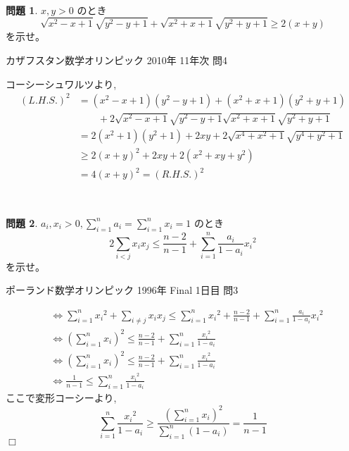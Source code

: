 \documentclass[uplatex, a5paper]{jsarticle}
\makeatletter
\theoremstyle{definition}
\newtheorem{prob}{問題}
\renewenvironment{proof}[1][\proofname]{
  \pushQED{\qed}%
  \normalfont \topsep6\p@\@plus6\p@\relax
  \trivlist
  \item[\hskip\labelsep
    #1\@addpunct{\textbf{.}}]\ignorespaces
}{%
  \popQED\endtrivlist\@endpefalse
}
\providecommand{\proofname}{証明}
\newcommand{\lhs }{ L.H.S. }
\newcommand{\rhs }{ R.H.S. }
\def\qed{\hfill $\Box$}
\makeatother
\begin{document}
\

\newpage


\begin{prob}
  \(x,y > 0\)
  のとき
  \[
  \sqrt{x^2-x+1}\sqrt{y^2-y+1} + \sqrt{x^2+x+1}\sqrt{y^2+y+1} \geq 2(x+y)
  \]
  を示せ。
  \begin{flushright}
    カザフスタン数学オリンピック 2010年 11年次 問4
  \end{flushright}
\end{prob}


\begin{proof}

コーシーシュワルツより,
\begin{align*}
( \lhs )^2 &= (x^2-x+1)(y^2-y+1) + (x^2+x+1)(y^2+y+1) \\
& \qquad + 2\sqrt{x^2-x+1}\sqrt{y^2-y+1}\sqrt{x^2+x+1}\sqrt{y^2+y+1} \\
&=     2(x^2+1)(y^2+1) + 2xy + 2\sqrt{ x^4+x^2+1 }\sqrt{ y^4+y^2+1 } \\
&\geq  2(x+y)^2 + 2xy + 2(x^2+xy+y^2) \\
&=     4(x+y)^2 = ( \rhs )^2
\end{align*}

\end{proof}



\








\newpage

\begin{prob}
  \(a_i , x_i > 0 , \displaystyle\sum_{i=1}^n a_i =\sum_{i=1}^n x_i = 1\)
  のとき
  \[
  2\sum_{i<j}x_ix_j \leq \frac{n-2}{n-1} + \sum_{i=1}^n \frac{a_i}{1-a_i}{x_i}^2
  \]
  を示せ。
  \begin{flushright}
    ポーランド数学オリンピック 1996年 Final 1日目 問3
  \end{flushright}
\end{prob}


\begin{proof}

\begin{align*}
& \Leftrightarrow \sum_{i=1}^n {x_i}^2 + \sum_{i\neq j}x_ix_j \leq \sum_{i=1}^n {x_i}^2 + \frac{n-2}{n-1} + \sum_{i=1}^n \frac{a_i}{1-a_i}{x_i}^2 \\
& \Leftrightarrow \left( \sum_{i=1}^n x_i \right)^2 \leq \frac{n-2}{n-1} + \sum_{i=1}^n \frac{{x_i}^2}{1-a_i} \\
& \Leftrightarrow \left( \sum_{i=1}^n x_i \right)^2 \leq \frac{n-2}{n-1} + \sum_{i=1}^n \frac{{x_i}^2}{1-a_i} \\
& \Leftrightarrow \frac{1}{n-1} \leq \sum_{i=1}^n \frac{{x_i}^2}{1-a_i}
\end{align*}
ここで変形コーシーより,
$$
\sum_{i=1}^n \frac{{x_i}^2}{1-a_i} \geq \frac{ \left( \sum_{i=1}^n x_i \right) ^2 }{ \sum_{i=1}^n (1-a_i) } = \frac{1}{n-1}
$$
\qed

\end{proof}
\end{document}
